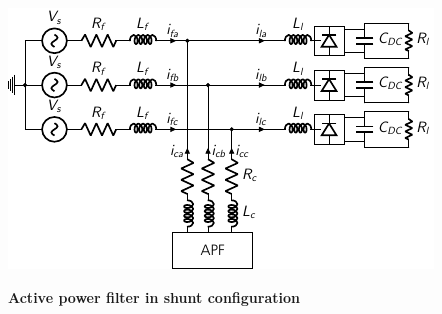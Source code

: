 \documentclass[a0paper,portrait]{baposter}
\begin{document}
\begin{poster}
{\vspace{-.17em}
\begin{center}
%
\includegraphics{gridmodel}
\end{center}

\textbf{Active power filter in shunt configuration}

}


\end{poster}
\end{document}
